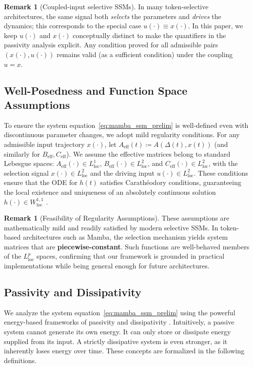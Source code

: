 \documentclass[10pt]{article} %
\def\eqref#1{equation~\ref{#1}}
\newcommand{\loc}{\mathrm{loc}}                         %
\theoremstyle{definition}
\newtheorem{remark}[theorem]{Remark}
\begin{document}
\begin{remark}[Coupled-input selective SSMs]
In many token-selective architectures, the same signal both \emph{selects} the parameters and \emph{drives} the dynamics; this corresponds to the special case $u(\cdot)\equiv x(\cdot)$. In this paper, we keep $u(\cdot)$ and $x(\cdot)$ conceptually distinct to make the quantifiers in the passivity analysis explicit. Any condition proved for all admissible pairs $(x(\cdot),u(\cdot))$ remains valid (as a sufficient condition) under the coupling $u=x$.
\end{remark}

\subsection{Well-Posedness and Function Space Assumptions}
\label{subsec:wellposedness}
To ensure the system \eqref{eq:mamba_ssm_prelim} is well-defined even with discontinuous parameter changes, we adopt mild regularity conditions. For any admissible input trajectory $x(\cdot)$, let $A_{\text{eff}}(t) \coloneqq A(\Delta(t), x(t))$ (and similarly for $B_{\text{eff}}, C_{\text{eff}}$). We assume the effective matrices belong to standard Lebesgue spaces: $A_{\text{eff}}(\cdot) \in L^1_{\loc}$, $B_{\text{eff}}(\cdot) \in L^2_{\loc}$, and $C_{\text{eff}}(\cdot) \in L^2_{\loc}$, with the selection signal $x(\cdot) \in L^2_{\loc}$ and the driving input $u(\cdot) \in L^2_{\loc}$. These conditions ensure that the ODE for $h(t)$ satisfies Carathéodory conditions, guaranteeing the local existence and uniqueness of an absolutely continuous solution $h(\cdot) \in W^{1,1}_{\loc}$ \citep{filippov1988existence, coddington1956theory}.

\begin{remark}[Feasibility of Regularity Assumptions]
These assumptions are mathematically mild and readily satisfied by modern selective SSMs. In token-based architectures such as Mamba, the selection mechanism yields system matrices that are \textbf{piecewise-constant}. Such functions are well-behaved members of the $L^p_{\loc}$ spaces, confirming that our framework is grounded in practical implementations while being general enough for future architectures.
\end{remark}

\subsection{Passivity and Dissipativity}
We analyze the system \eqref{eq:mamba_ssm_prelim} using the powerful energy-based frameworks of passivity and dissipativity \citep{Willems1972DissipativeDS}. Intuitively, a passive system cannot generate its own energy. It can only store or dissipate energy supplied from its input. A strictly dissipative system is even stronger, as it inherently loses energy over time. These concepts are formalized in the following definitions.
\end{document}
